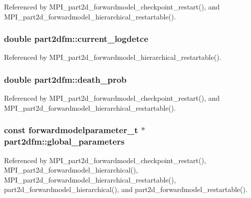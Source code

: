 Referenced by M\+P\+I\+\_\+part2d\+\_\+forwardmodel\+\_\+checkpoint\+\_\+restart(), and M\+P\+I\+\_\+part2d\+\_\+forwardmodel\+\_\+hierarchical\+\_\+restartable().

\subsubsection[{\texorpdfstring{current\+\_\+logdetce}{current_logdetce}}]{\setlength{\rightskip}{0pt plus 5cm}double part2dfm\+::current\+\_\+logdetce}\hypertarget{structpart2dfm_ad539c00d46cbbe28f446ccf1fa35ab4c}{}\label{structpart2dfm_ad539c00d46cbbe28f446ccf1fa35ab4c}


Referenced by M\+P\+I\+\_\+part2d\+\_\+forwardmodel\+\_\+hierarchical\+\_\+restartable().

\subsubsection[{\texorpdfstring{death\+\_\+prob}{death_prob}}]{\setlength{\rightskip}{0pt plus 5cm}double part2dfm\+::death\+\_\+prob}\hypertarget{structpart2dfm_a4f2ef201a4e7ea4b716b9a76cf04fa99}{}\label{structpart2dfm_a4f2ef201a4e7ea4b716b9a76cf04fa99}


Referenced by M\+P\+I\+\_\+part2d\+\_\+forwardmodel\+\_\+checkpoint\+\_\+restart(), and M\+P\+I\+\_\+part2d\+\_\+forwardmodel\+\_\+hierarchical\+\_\+restartable().

\subsubsection[{\texorpdfstring{global\+\_\+parameters}{global_parameters}}]{\setlength{\rightskip}{0pt plus 5cm}const {\bf forwardmodelparameter\+\_\+t} $\ast$ part2dfm\+::global\+\_\+parameters}\hypertarget{structpart2dfm_afa1305d51cc45376446343fb6451d29f}{}\label{structpart2dfm_afa1305d51cc45376446343fb6451d29f}


Referenced by M\+P\+I\+\_\+part2d\+\_\+forwardmodel\+\_\+checkpoint\+\_\+restart(), M\+P\+I\+\_\+part2d\+\_\+forwardmodel\+\_\+hierarchical(), M\+P\+I\+\_\+part2d\+\_\+forwardmodel\+\_\+hierarchical\+\_\+restartable(), part2d\+\_\+forwardmodel\+\_\+hierarchical(), and part2d\+\_\+forwardmodel\+\_\+restartable().

